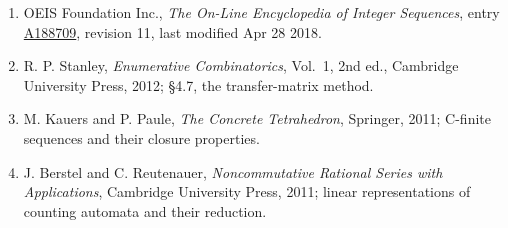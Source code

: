 \documentclass[11pt]{article}
\theoremstyle{definition}
\begin{document}
\begin{enumerate}

\item OEIS Foundation Inc., \emph{The On-Line Encyclopedia of Integer Sequences}, entry \href{https://oeis.org/A188709}{A188709}, revision 11, last modified Apr 28 2018.

\item R. P. Stanley, \emph{Enumerative Combinatorics}, Vol.~1, 2nd ed., Cambridge University Press, 2012; \S4.7, the transfer-matrix method.

\item M. Kauers and P. Paule, \emph{The Concrete Tetrahedron}, Springer, 2011; C-finite sequences and their closure properties.

\item J. Berstel and C. Reutenauer, \emph{Noncommutative Rational Series with Applications}, Cambridge University Press, 2011; linear representations of counting automata and their reduction.

\end{enumerate}
\end{document}

